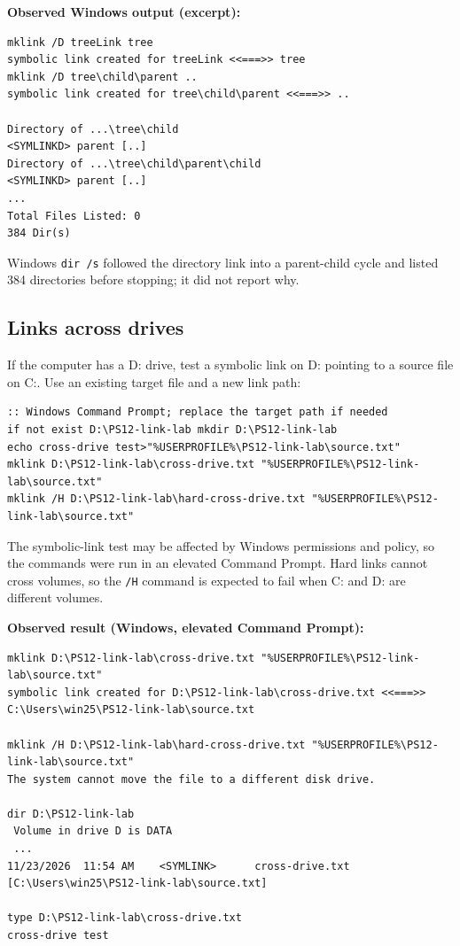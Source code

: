 \documentclass[a4paper,11pt]{article}
\begin{document}
\noindent\textbf{Observed Windows output (excerpt):}
\begin{lstlisting}
mklink /D treeLink tree
symbolic link created for treeLink <<===>> tree
mklink /D tree\child\parent ..
symbolic link created for tree\child\parent <<===>> ..

Directory of ...\tree\child
<SYMLINKD> parent [..]
Directory of ...\tree\child\parent\child
<SYMLINKD> parent [..]
...
Total Files Listed: 0
384 Dir(s)
\end{lstlisting}

Windows \texttt{dir /s} followed the directory link into a parent-child cycle
and listed 384 directories before stopping; it did not report why.

\subsection{Links across drives}
If the computer has a D: drive, test a symbolic link on D: pointing to a
source file on C:. Use an existing target file and a new link path:
\begin{lstlisting}
:: Windows Command Prompt; replace the target path if needed
if not exist D:\PS12-link-lab mkdir D:\PS12-link-lab
echo cross-drive test>"%USERPROFILE%\PS12-link-lab\source.txt"
mklink D:\PS12-link-lab\cross-drive.txt "%USERPROFILE%\PS12-link-lab\source.txt"
mklink /H D:\PS12-link-lab\hard-cross-drive.txt "%USERPROFILE%\PS12-link-lab\source.txt"
\end{lstlisting}

The symbolic-link test may be affected by Windows permissions and policy, so
the commands were run in an elevated Command Prompt. Hard links cannot cross
volumes, so the \texttt{/H} command is expected to fail when C: and D: are
different volumes.

\noindent\textbf{Observed result (Windows, elevated Command Prompt):}
\begin{lstlisting}
mklink D:\PS12-link-lab\cross-drive.txt "%USERPROFILE%\PS12-link-lab\source.txt"
symbolic link created for D:\PS12-link-lab\cross-drive.txt <<===>> C:\Users\win25\PS12-link-lab\source.txt

mklink /H D:\PS12-link-lab\hard-cross-drive.txt "%USERPROFILE%\PS12-link-lab\source.txt"
The system cannot move the file to a different disk drive.

dir D:\PS12-link-lab
 Volume in drive D is DATA
 ...
11/23/2026  11:54 AM    <SYMLINK>      cross-drive.txt [C:\Users\win25\PS12-link-lab\source.txt]

type D:\PS12-link-lab\cross-drive.txt
cross-drive test
\end{lstlisting}
\end{document}
